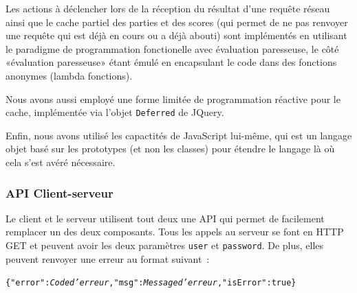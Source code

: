 \documentclass[a4paper,11pt,french]{article}
\begin{document}
Les actions à déclencher lors de la réception du résultat d'une requête réseau ainsi que le cache partiel des parties et des scores (qui
permet de ne pas renvoyer une requête qui est déjà en cours ou a déjà abouti) sont implémentés en utilisant le paradigme de programmation
fonctionelle avec évaluation paresseuse, le côté «évaluation paresseuse» étant émulé en encapsulant le code dans des fonctions anonymes
(lambda fonctions).

Nous avons aussi employé une forme limitée de programmation réactive pour le cache, implémentée via l'objet \verb!Deferred! de JQuery.

Enfin, nous avons utilisé les capactités de JavaScript lui-même, qui est un langage objet basé sur les prototypes (et non les classes) pour
étendre le langage là où cela s'est avéré nécessaire.

\subsubsection{API Client-serveur}
Le client et le serveur utilisent tout deux une API qui permet de facilement remplacer un des deux composants. Tous les appels au serveur se font en HTTP GET et peuvent avoir les deux paramètres \verb!user! et \verb!password!. De plus, elles peuvent renvoyer une erreur au format suivant~:
\begin{alltt}
\{"error":\textit{Code d'erreur}, "msg":\textit{Message d'erreur}, "isError":true\}
\end{alltt}
\end{document}
